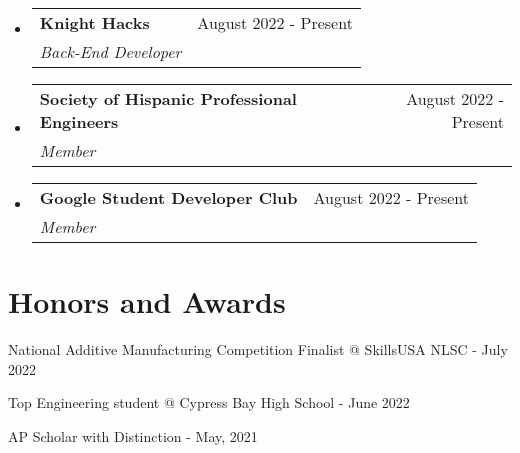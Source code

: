 \documentclass[a4paper,20pt]{article}
\makeatletter
\newcommand{\resumeSubheading}[4]{
  \vspace{-1pt}\item
    \begin{tabular*}{0.97\textwidth}{l@{\extracolsep{\fill}}r}
      \textbf{#1} & #2 \\
      \textit{#3} & \textit{#4} \\
    \end{tabular*}\vspace{-5pt}
}
\newcommand{\resumeSubHeadingListStart}{\begin{itemize}[leftmargin=*]}
\newcommand{\resumeSubHeadingListEnd}{\end{itemize}}
\makeatother
\begin{document}
\resumeSubHeadingListStart
\resumeSubheading{Knight Hacks}{August 2022 - Present}
{Back-End Developer}{}
\resumeSubHeadingListEnd

\vspace{-15pt}

\resumeSubHeadingListStart
\resumeSubheading{Society of Hispanic Professional Engineers}{August 2022 - Present}
{Member}{}

\resumeSubHeadingListEnd

\vspace{-15pt}

\resumeSubHeadingListStart
\resumeSubheading{Google Student Developer Club}{August 2022 - Present}
{Member}{}
\resumeSubHeadingListEnd
\vspace{-5pt}
\section{Honors and Awards}
\begin{description}[font=$\bullet$]
\item {National Additive Manufacturing Competition Finalist @ SkillsUSA NLSC - July 2022}
\vspace{-5pt}
\item {Top Engineering student @ Cypress Bay High School - June 2022 }
\vspace{-5pt}
\item {AP Scholar with Distinction - May, 2021}

\end{description}

\vspace{-5pt}
\end{document}
